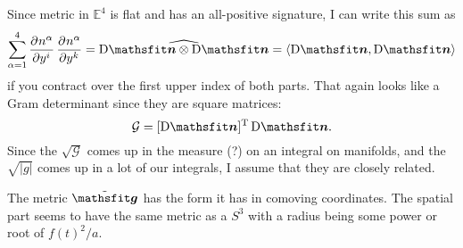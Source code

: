 Since metric in $\mathbb E^4$ is flat and has an all-positive signature, I can
write this sum as
\[
    \sum_{\alpha = 1}^4 \dpd{{n^\alpha}}{{y^i}} \dpd{{n^\alpha}} {{y^k}} =
    \widehat{\Dif \tens n \otimes \Dif \tens n} = \inner{\Dif \tens n}{\Dif
    \tens n}
\]
if you contract over the first upper index of both parts. That again looks like
a Gram determinant since they are square matrices:
\[
    \mathcal G = [\Dif \tens n]^\mathrm T \Dif \tens n.
\]
Since the $\sqrt{\mathcal G}$ comes up in the measure (?) on an integral on
manifolds, and the $\sqrt{|g|}$ comes up in a lot of our integrals, I assume
that they are closely related.

The metric $\tilde{\tens g}$ has the form it has in comoving coordinates. The
spatial part seems to have the same metric as a $S^3$ with a radius being some
power or root of $f(t)^2/a$.

\IfFileExists{\bibliographyfile}{
    \printbibliography
}{}



